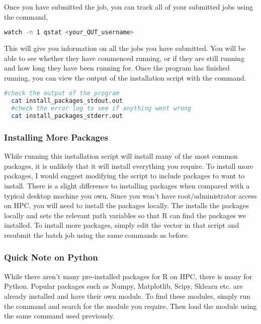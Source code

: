 %
%
Once you have submitted the job, you can track all of your submitted jobs using the command,
%
\begin{lstlisting}[language=bash, frame=single]
  watch -n 1 qstat <your_QUT_username>
\end{lstlisting}
%
%
This will give you information on all the jobs you have submitted. You will be able to see whether they have commenced running, or if they are still running and how long they have been running for. Once the program has finished running, you can view the output of the installation script with the  command.
\begin{lstlisting}[language=bash, frame=single]
  #check the output of the program
  cat install_packages_stdout.out
  #check the error log to see if anything went wrong
  cat install_packages_stderr.out
\end{lstlisting}
%
%
%
\subsubsection{Installing More Packages}
%
%
While running this installation script will install many of the most common packages, it is unlikely that it will install everything you require. To install more packages, I would suggest modifying the  script to include packages to want to install. There is a slight difference to installing packages when compared with a typical desktop machine you own. Since you won't have root/administrator access on HPC, you will need to install the packages locally. The  installs the packages locally and sets the relevant path variables so that R can find the packages we installed. To install more packages, simply edit the  vector in that script and resubmit the batch job using the same commands as before.
%
%
\subsubsection{Quick Note on Python}
%
%
While there aren't many pre-installed packages for R on HPC, there is many for Python. Popular packages such as Numpy, Matplotlib, Scipy, Sklearn etc. are already installed and have their own module. To find these modules, simply run the  command and search for the module you require. Then load the module using the same  command used previously.
%
%
%
